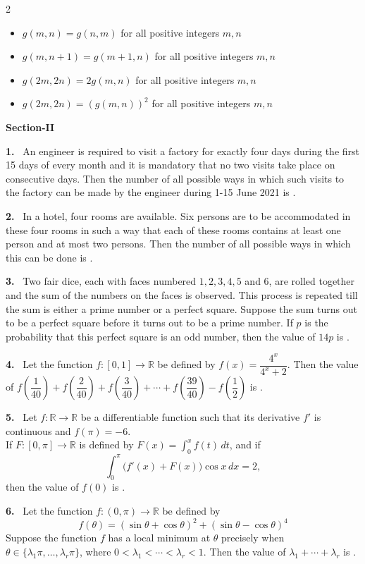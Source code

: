 \documentclass[10pt]{extarticle}
\newcommand{\sect}[1]{\par\smallskip\noindent\textbf{#1}\par}
\newcommand{\qn}[1]{\par\smallskip\noindent\textbf{#1.}~}
\newenvironment{qoptions}{\begin{itemize}[leftmargin=1.8em,itemsep=1pt,topsep=2pt,label={}]}{\end{itemize}}
\newcommand{\opt}[2]{\item[(#1)] #2}
\begin{document}
\begin{multicols}{2}
\begin{qoptions}
\opt{A}{$g(m,n)=g(n,m)$ for all positive integers $m,n$}
\opt{B}{$g(m,n+1)=g(m+1,n)$ for all positive integers $m,n$}
\opt{C}{$g(2m,2n)=2g(m,n)$ for all positive integers $m,n$}
\opt{D}{$g(2m,2n)=(g(m,n))^2$ for all positive integers $m,n$}
\end{qoptions}
\sect{Section-II}
\qn{1} An engineer is required to visit a factory for exactly four days during the first 15 days of every month and it is mandatory that no two visits take place on consecutive days. Then the number of all possible ways in which such visits to the factory can be made by the engineer during 1-15 June 2021 is \underline{\hspace{2cm}}.
\qn{2} In a hotel, four rooms are available. Six persons are to be accommodated in these four rooms in such a way that each of these rooms contains at least one person and at most two persons. Then the number of all possible ways in which this can be done is \underline{\hspace{2cm}}.
\qn{3} Two fair dice, each with faces numbered $1,2,3,4,5$ and $6$, are rolled together and the sum of the numbers on the faces is observed. This process is repeated till the sum is either a prime number or a perfect square. Suppose the sum turns out to be a perfect square before it turns out to be a prime number. If $p$ is the probability that this perfect square is an odd number, then the value of $14p$ is \underline{\hspace{2cm}}.
\qn{4} Let the function $f:[0,1]\to\mathbb R$ be defined by $f(x)=\dfrac{4^x}{4^x+2}$. Then the value of $f\!\left(\dfrac1{40}\right)+f\!\left(\dfrac2{40}\right)+f\!\left(\dfrac3{40}\right)+\cdots+f\!\left(\dfrac{39}{40}\right)-f\!\left(\dfrac12\right)$ is \underline{\hspace{2cm}}.
\qn{5} Let $f:\mathbb R\to\mathbb R$ be a differentiable function such that its derivative $f'$ is continuous and $f(\pi)=-6$.\\
If $F:[0,\pi]\to\mathbb R$ is defined by $F(x)=\displaystyle\int_0^x f(t)\,dt$, and if
\[\int_0^\pi\bigl(f'(x)+F(x)\bigr)\cos x\,dx=2,\]
then the value of $f(0)$ is \underline{\hspace{2cm}}.
\qn{6} Let the function $f:(0,\pi)\to\mathbb R$ be defined by
\[f(\theta)=(\sin\theta+\cos\theta)^2+(\sin\theta-\cos\theta)^4\]
Suppose the function $f$ has a local minimum at $\theta$ precisely when $\theta\in\{\lambda_1\pi,\dots,\lambda_r\pi\}$, where $0<\lambda_1<\cdots<\lambda_r<1$. Then the value of $\lambda_1+\cdots+\lambda_r$ is \underline{\hspace{2cm}}.

\end{multicols}
\end{document}
